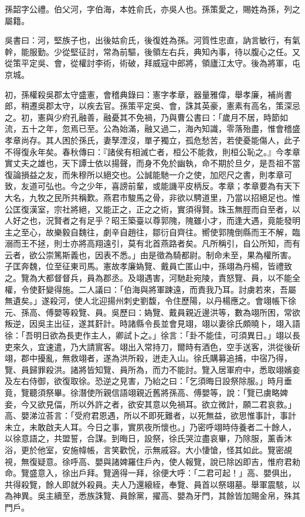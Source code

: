 
\begin{pinyinscope}
孫韶字公禮。伯父河，字伯海，本姓俞氏，亦吳人也。孫策愛之，賜姓為孫，列之屬籍。

吳書曰：河，堅族子也，出後姑俞氏，後復姓為孫。河質性忠直，訥言敏行，有氣幹，能服勤。少從堅征討，常為前驅，後領左右兵，典知內事，待以腹心之任。又從策平定吳、會，從權討李術，術破，拜威寇中郎將，領廬江太守。後為將軍，屯京城。

初，孫權殺吳郡太守盛憲，會稽典錄曰：憲字孝章，器量雅偉，舉孝廉，補尚書郎，稍遷吳郡太守，以疾去官。孫策平定吳、會，誅其英豪，憲素有高名，策深忌之。初，憲與少府孔融善，融憂其不免禍，乃與曹公書曰：「歲月不居，時節如流，五十之年，忽焉已至。公為始滿，融又過二，海內知識，零落殆盡，惟會稽盛孝章尚存。其人困於孫氏，妻孥湮沒，單孑獨立，孤危愁苦，若使憂能傷人，此子不得復永年矣。春秋傳曰：『諸侯有相滅亡者，桓公不能救，則桓公恥之。』今孝章實丈夫之雄也，天下譚士依以揚聲，而身不免於幽執，命不期於旦夕，是吾祖不當復論損益之友，而朱穆所以絕交也。公誠能馳一介之使，加咫尺之書，則孝章可致，友道可弘也。今之少年，喜謗前輩，或能譏平皮柄反。孝章；孝章要為有天下大名，九牧之民所共稱歎。燕君市駿馬之骨，非欲以騁道里，乃當以招絕足也。惟公匡復漢室，宗社將絕，又能正之，正之之術，實須得賢。珠玉無脛而自至者，以人好之也，況賢者之有足乎？昭王築臺以尊郭隗，隗雖小才，而逢大遇，竟能發明主之至心，故樂毅自魏往，劇辛自趙往，鄒衍自齊往。嚮使郭隗倒縣而王不解，臨溺而王不拯，則士亦將高翔遠引，莫有北首燕路者矣。凡所稱引，自公所知，而有云者，欲公崇篤斯義也，因表不悉。」由是徵為騎都尉。制命未至，果為權所害。子匡奔魏，位至征東司馬。憲故孝廉媯覽、戴員亡匿山中，孫翊為丹楊，皆禮致之。覽為大都督督兵，員為郡丞。及翊遇害，河馳赴宛陵，責怒覽、員，以不能全權，令使姧變得施。二人議曰：「伯海與將軍踈遠，而責我乃耳。討虜若來，吾屬無遺矣。」遂殺河，使人北迎揚州刺史劉馥，令住歷陽，以丹楊應之。會翊帳下徐元、孫高、傅嬰等殺覽、員。吳歷曰：媯覽、戴員親近邊洪等，數為翊所困，常欲叛逆，因吳主出征，遂其姧計。時諸縣令長並會見翊，翊以妻徐氏頗曉卜，翊入語徐：「吾明日欲為長吏作主人，卿試卜之。」徐言：「卦不能佳，可須異日。」翊以長吏來久，宜速遣，乃大請賔客。翊出入常持刀，爾時有酒色，空手送客，洪從後斫翊，郡中擾亂，無救翊者，遂為洪所殺，迸走入山。徐氏購募追捕，中宿乃得，覽、員歸罪殺洪。諸將皆知覽、員所為，而力不能討。覽入居軍府中，悉取翊嬪妾及左右侍御，欲復取徐。恐逆之見害，乃紿之曰：「乞須晦日設祭除服。」時月垂竟，覽聽須祭畢。徐潛使所親信語翊親近舊將孫高、傅嬰等，說：「覽已虜略婢妾，今又欲見偪，所以外許之者，欲安其意以免禍耳。欲立微計，願二君哀救。」高、嬰涕泣荅言：「受府君恩遇，所以不即死難者，以死無益，欲思惟事計，事計未立，未敢啟夫人耳。今日之事，實夙夜所懷也。」乃密呼翊時侍養者二十餘人，以徐意語之，共盟誓，合謀。到晦日，設祭，徐氏哭泣盡哀畢，乃除服，薰香沐浴，更於他室，安施幃帳，言笑歡恱，示無戚容。大小悽愴，怪其如此。覽密覘視，無復疑意。徐呼高、嬰與諸婢羅住戶內，使人報覽，說已除凶即吉，惟府君勑命。覽盛意入，徐出戶拜。覽適得一拜，徐便大呼：「二君可起！」高、嬰俱出，共得殺覽，餘人即就外殺員。夫人乃還縗絰，奉覽、員首以祭翊墓。舉軍震駭，以為神異。吳主續至，悉族誅覽、員餘黨，擢高、嬰為牙門，其餘皆加賜金帛，殊其門戶。


\end{pinyinscope}
